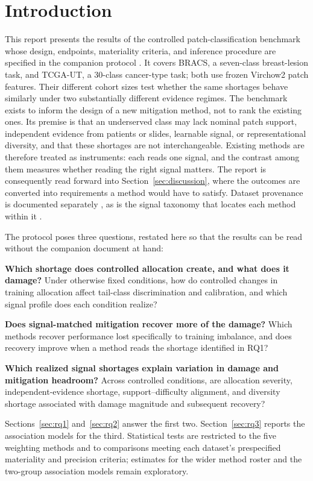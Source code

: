 \documentclass[11pt]{article}
\begin{document}
\section{Introduction}
\label{sec:intro}
This report presents the results of the controlled patch-classification benchmark whose design, endpoints, materiality criteria, and inference procedure are specified in the companion protocol \citep{queisler2026benchmarkProtocol}. It covers BRACS, a seven-class breast-lesion task, and TCGA-UT, a 30-class cancer-type task; both use frozen Virchow2 patch features. Their different cohort sizes test whether the same shortages behave similarly under two substantially different evidence regimes.
The benchmark exists to inform the design of a new mitigation method, not to rank the existing ones. Its premise is that an underserved class may lack nominal patch support, independent evidence from patients or slides, learnable signal, or representational diversity, and that these shortages are not interchangeable. Existing methods are therefore treated as instruments: each reads one signal, and the contrast among them measures whether reading the right signal matters. The report is consequently read forward into Section~\ref{sec:discussion}, where the outcomes are converted into requirements a method would have to satisfy. Dataset provenance is documented separately \citep{queisler2026datasets}, as is the signal taxonomy that locates each method within it \citep{queisler2026imbalanceMethods}.

The protocol poses three questions, restated here so that the results can be read without the companion document at hand:
\begin{description}
  \setlength{\itemsep}{0.6em}
  \item[RQ1.] \textbf{Which shortage does controlled allocation create, and what does it damage?} Under otherwise fixed conditions, how do controlled changes in training allocation affect tail-class discrimination and calibration, and which signal profile does each condition realize?
  \item[RQ2.] \textbf{Does signal-matched mitigation recover more of the damage?} Which methods recover performance lost specifically to training imbalance, and does recovery improve when a method reads the shortage identified in RQ1?
  \item[RQ3.] \textbf{Which realized signal shortages explain variation in damage and mitigation headroom?} Across controlled conditions, are allocation severity, independent-evidence shortage, support--difficulty alignment, and diversity shortage associated with damage magnitude and subsequent recovery?
\end{description}
\noindent Sections~\ref{sec:rq1} and~\ref{sec:rq2} answer the first two. Section~\ref{sec:rq3} reports the association models for the third. Statistical tests are restricted to the five weighting methods and to comparisons meeting each dataset's prespecified materiality and precision criteria; estimates for the wider method roster and the two-group association models remain exploratory.
\end{document}
